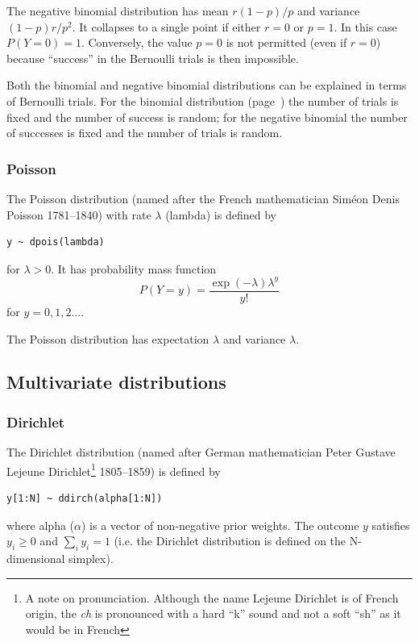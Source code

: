 \documentclass[11pt, a4paper, titlepage]{report}
\begin{document}
{The negative binomial distribution has mean $r(1-p)/p$ and variance
$(1 - p)r/p^2$. It collapses to a single point if either $r=0$ or
$p=1$. In this case $P(Y=0) = 1$. Conversely, the value $p=0$ is not
permitted (even if $r=0$) because ``success'' in the Bernoulli trials
is then impossible.

Both the binomial and negative binomial distributions can be explained
in terms of Bernoulli trials. For the binomial distribution
(page~\pageref{bugs:dbin}) the number of trials is fixed and the number of
success is random; for the negative binomial the number of successes
is fixed and the number of trials is random.

\subsubsection{Poisson}

The Poisson distribution (named after the French mathematician
Sim\'{e}on Denis Poisson 1781--1840) with rate $\lambda$ (lambda) is
defined by
\begin{verbatim}
y ~ dpois(lambda)
\end{verbatim}
for $\lambda > 0$. It has probability mass function
\[
P(Y=y) = \frac{\textstyle \exp(-\lambda) \lambda^y}{\textstyle y!}
\]
for $y = 0, 1, 2 \ldots$.

The Poisson distribution has expectation $\lambda$ and variance $\lambda$.

\subsection{Multivariate distributions}

\subsubsection{Dirichlet}
\label{bugs:ddirch}

The Dirichlet distribution (named after German mathematician Peter
Gustave Lejeune Dirichlet\footnote{A note on pronunciation. Although
  the name Lejeune Dirichlet is of French origin, the {\em ch} is
  pronounced with a hard ``k'' sound and not a soft ``sh'' as it would
  be in French} 1805--1859) is defined by
\begin{verbatim}
y[1:N] ~ ddirch(alpha[1:N])
\end{verbatim}
where alpha ($\alpha$) is a vector of non-negative prior weights. The
outcome $y$ satisfies $y_i \geq 0$ and $\sum_i y_i = 1$ (i.e. the
Dirichlet distribution is defined on the N-dimensional simplex).

}
\end{document}
